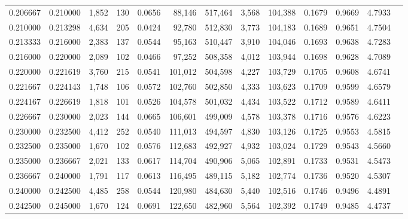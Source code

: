 \begin{tabular}{rrrrrrrrrrrrr}
0.206667 & 0.210000 & 1,852 & 130 &                                     0.0656 &  88,146 & 517,464 &   3,568 & 104,388 & 0.1679 & 0.9669 & 4.7933 \\
0.210000 & 0.213298 & 4,634 & 205 &                                     0.0424 &  92,780 & 512,830 &   3,773 & 104,183 & 0.1689 & 0.9651 & 4.7504 \\
0.213333 & 0.216000 & 2,383 & 137 &                                     0.0544 &  95,163 & 510,447 &   3,910 & 104,046 & 0.1693 & 0.9638 & 4.7283 \\
0.216000 & 0.220000 & 2,089 & 102 &                                     0.0466 &  97,252 & 508,358 &   4,012 & 103,944 & 0.1698 & 0.9628 & 4.7089 \\
0.220000 & 0.221619 & 3,760 & 215 &                                     0.0541 & 101,012 & 504,598 &   4,227 & 103,729 & 0.1705 & 0.9608 & 4.6741 \\
0.221667 & 0.224143 & 1,748 & 106 &                                     0.0572 & 102,760 & 502,850 &   4,333 & 103,623 & 0.1709 & 0.9599 & 4.6579 \\
0.224167 & 0.226619 & 1,818 & 101 &                                     0.0526 & 104,578 & 501,032 &   4,434 & 103,522 & 0.1712 & 0.9589 & 4.6411 \\
0.226667 & 0.230000 & 2,023 & 144 &                                     0.0665 & 106,601 & 499,009 &   4,578 & 103,378 & 0.1716 & 0.9576 & 4.6223 \\
0.230000 & 0.232500 & 4,412 & 252 &                                     0.0540 & 111,013 & 494,597 &   4,830 & 103,126 & 0.1725 & 0.9553 & 4.5815 \\
0.232500 & 0.235000 & 1,670 & 102 &                                     0.0576 & 112,683 & 492,927 &   4,932 & 103,024 & 0.1729 & 0.9543 & 4.5660 \\
0.235000 & 0.236667 & 2,021 & 133 &                                     0.0617 & 114,704 & 490,906 &   5,065 & 102,891 & 0.1733 & 0.9531 & 4.5473 \\
0.236667 & 0.240000 & 1,791 & 117 &                                     0.0613 & 116,495 & 489,115 &   5,182 & 102,774 & 0.1736 & 0.9520 & 4.5307 \\
0.240000 & 0.242500 & 4,485 & 258 &                                     0.0544 & 120,980 & 484,630 &   5,440 & 102,516 & 0.1746 & 0.9496 & 4.4891 \\
0.242500 & 0.245000 & 1,670 & 124 &                                     0.0691 & 122,650 & 482,960 &   5,564 & 102,392 & 0.1749 & 0.9485 & 4.4737 \\

\end{tabular}
